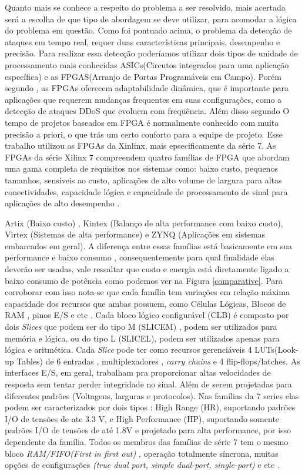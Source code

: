 Quanto mais se conhece a respeito do problema a ser resolvido, mais acertada será a escolha de que tipo de abordagem se deve utilizar, para acomodar a lógica do problema em questão. Como foi pontuado acima, o problema da detecção de ataques em tempo real, requer duas características principais, desempenho e precisão. Para realizar essa detecção poderíamos utilizar dois tipos de unidade de processamento mais conhecidas ASICs(Circutos integrados para uma aplicação específica) e as FPGAS(Arranjo de Portas Programáveis em Campo). Porém segundo , as FPGAs oferecem adaptabilidade dinâmica, que é importante para aplicações que requerem mudanças frequentes em suas configurações, como a detecção de ataques DDoS que evoluem com freqüência. Além disso segundo  O tempo de projetos baseados em FPGA é normalmente conhecido com muita precisão a priori, o que trás um certo conforto para a equipe de projeto. Esse trabalho utilizou as FPGAs da Xinlinx, mais epsecificamente da série 7.
As FPGAs da série Xilinx 7 compreendem quatro famílias de FPGA que abordam uma gama completa de requisitos nos sistemas como: baixo custo, pequenos tamanhos, sensíveis ao custo, aplicações de alto volume de largura para altas conectividades, capacidade lógica e capacidade de processamento de sinal para aplicações de alto desempenho \cite{przybus2010xilinx}.

Artix (Baixo custo) , Kintex (Balanço de alta performance com baixo custo), Virtex (Sistemas de alta performance) e ZYNQ (Aplicações em sistemas embarcados em geral).
A diferença entre essas famílias está basicamente em sua performance e baixo consumo , consequentemente para qual finalidade elas deverão ser usadas, vale ressaltar que custo e energia está diretamente ligado a baixo consumo de potência como podemos ver na Figura \ref{comparative}. Para corroborar com isso nota-se que cada família tem variações em relação máxima capacidade dos recursos que ambas possuem, como Células Lógicas, Blocos de RAM , pinos E/S e etc .
Cada bloco lógico configurável (CLB) é composto por dois \textit{Slices} que podem ser do tipo M (SLICEM) , podem ser utilizados para memória e lógica, ou do tipo L (SLICEL), podem ser utilizados apenas para lógica e aritmética. 
Cada \textit{Slice} pode ter como recursos gerenciáveis 4 LUTs(Look-up Tables) de 6 entradas , multiplexadores , \textit{carry chains} e 4 flip-flops/latches.
As interfaces E/S, em geral, trabalham pra proporcionar altas velocidades de resposta sem tentar perder integridade no sinal. Além de serem projetadas para diferentes padrões (Voltagens, larguras e protocolos). Nas famílias da 7 series elas podem ser caracterizados por dois tipos : High Range (HR), suportando padrões I/O de tensões de ate 3.3 V,  e High Performance (HP), suportando somente padrões I/O de tensões de até 1.8V e projetado para alta performance, por isso dependente da família.
Todos os membros das famílias de série 7 tem o mesmo bloco \textit{RAM/FIFO(First in first out)} , operação totalmente síncrona, muitas opções de configurações \textit{(true dual port, simple dual-port, single-port)} e etc \cite{demetrioarquitetura}. 

